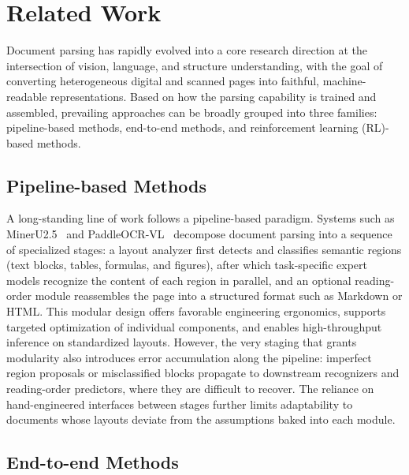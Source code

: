 \section{Related Work}

Document parsing has rapidly evolved into a core research direction at the intersection of vision, language, and structure understanding, with the goal of converting heterogeneous digital and scanned pages into faithful, machine-readable representations. Based on how the parsing capability is trained and assembled, prevailing approaches can be broadly grouped into three families: pipeline-based methods, end-to-end methods, and reinforcement learning (RL)-based methods.

\subsection{Pipeline-based Methods}

A long-standing line of work follows a pipeline-based paradigm. Systems such as MinerU2.5~\cite{niu2025mineru2} and PaddleOCR-VL~\cite{cui2025paddleocr} decompose document parsing into a sequence of specialized stages: a layout analyzer first detects and classifies semantic regions (text blocks, tables, formulas, and figures), after which task-specific expert models recognize the content of each region in parallel, and an optional reading-order module reassembles the page into a structured format such as Markdown or HTML. This modular design offers favorable engineering ergonomics, supports targeted optimization of individual components, and enables high-throughput inference on standardized layouts. However, the very staging that grants modularity also introduces error accumulation along the pipeline: imperfect region proposals or misclassified blocks propagate to downstream recognizers and reading-order predictors, where they are difficult to recover. The reliance on hand-engineered interfaces between stages further limits adaptability to documents whose layouts deviate from the assumptions baked into each module.

\subsection{End-to-end Methods}

